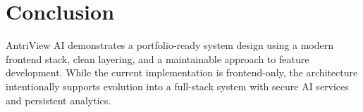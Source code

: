 \documentclass[11pt]{article}
\begin{document}
\section{Conclusion}
AntriView AI demonstrates a portfolio-ready system design using a modern frontend stack, clean layering, and a maintainable approach to feature development.
While the current implementation is frontend-only, the architecture intentionally supports evolution into a full-stack system with secure AI services and persistent analytics.
\end{document}
